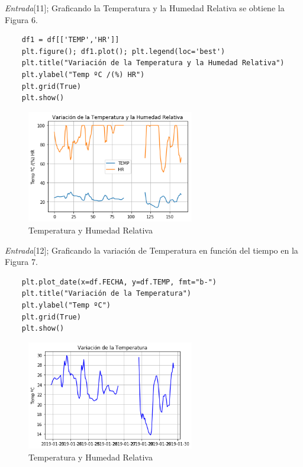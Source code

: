 \documentclass[11pt, spanish]{report}
\begin{document}
\emph{Entrada}[11]; Graficando la Temperatura y la Humedad Relativa se obtiene la Figura 6.
\begin{verbatim}
    df1 = df[['TEMP','HR']]
    plt.figure(); df1.plot(); plt.legend(loc='best')
    plt.title("Variación de la Temperatura y la Humedad Relativa")
    plt.ylabel("Temp ºC /(%) HR")
    plt.grid(True)
    plt.show()
\end{verbatim}
\begin{figure}[h]
\caption{Temperatura y Humedad Relativa}
\centering
\includegraphics[width=0.65\textwidth]{Temphum.png}
\end{figure}

\emph{Entrada}[12]; Graficando la variación de Temperatura en función del tiempo en la Figura 7.
\begin{verbatim}
    plt.plot_date(x=df.FECHA, y=df.TEMP, fmt="b-")
    plt.title("Variación de la Temperatura")
    plt.ylabel("Temp ºC")
    plt.grid(True)
    plt.show()
\end{verbatim}
\begin{figure}[h]
\caption{Temperatura y Humedad Relativa}
\centering
\includegraphics[width=0.65\textwidth]{temptiem.png}
\end{figure}
\end{document}
